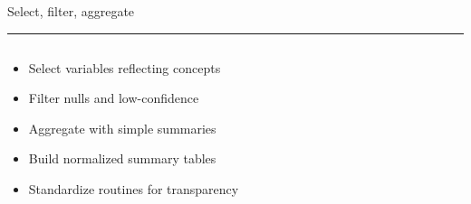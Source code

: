 \documentclass[aspectratio=169]{beamer}
\newcommand{\TitleFont}{\rmfamily}
\begin{document}
\begin{frame}[t]{}
  \vspace*{0.5cm}
  {\TitleFont\fontsize{18}{22}\selectfont\color{LUBronze}Select, filter, aggregate\par}
  \vspace{0.3em}
  {\color{LUBronze}\rule{\linewidth}{0.8pt}}\par
  \vspace{0.2cm}
  \begin{columns}[t]
    \begin{column}[t]{0.45\textwidth}
      \vspace*{0pt}
      \begin{itemize}\setlength\itemsep{0.65em}
        \item Select variables reflecting concepts
        \item Filter nulls and low-confidence
        \item Aggregate with simple summaries
        \item Build normalized summary tables
        \item Standardize routines for transparency
      \end{itemize}
    \end{column}
  \end{columns}
\end{frame}
\end{document}
